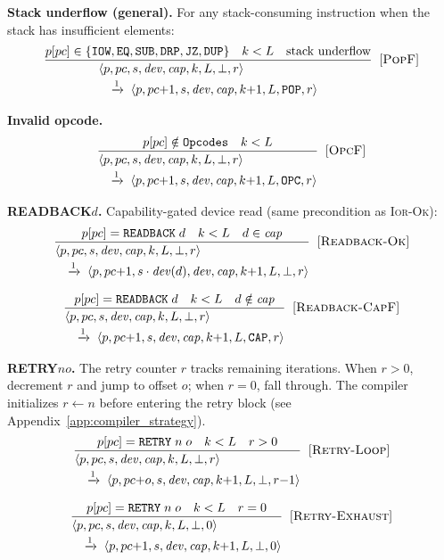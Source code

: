 \documentclass[a4paper,fleqn,longmktitle]{cas-dc}
\makeatletter
\newcommand{\irule}[4]{%
  \[
  \frac{\displaystyle #1}
       {\displaystyle
        \begin{array}{@{}l@{}}
          #2 \\[2pt]
          \quad\xrightarrow{1}\; #3
        \end{array}}
  \;\;[\textsc{#4}]
  \]%
}
\makeatother
\begin{document}
{\noindent\textbf{Stack underflow (general).} For any stack-consuming instruction when the stack has insufficient elements:
\irule{p[pc] \in \{\texttt{IOW}, \texttt{EQ}, \texttt{SUB}, \texttt{DRP}, \texttt{JZ}, \texttt{DUP}\} \quad k < L \quad \text{stack underflow}}
      {\langle p, pc, s, \mathit{dev}, \mathit{cap}, k, L, \bot, r \rangle}
      {\langle p, pc{+}1, s, \mathit{dev}, \mathit{cap}, k{+}1, L, \texttt{POP}, r \rangle}
      {PopF}

\noindent\textbf{Invalid opcode.}
\irule{p[pc] \notin \texttt{Opcodes} \quad k < L}
      {\langle p, pc, s, \mathit{dev}, \mathit{cap}, k, L, \bot, r \rangle}
      {\langle p, pc{+}1, s, \mathit{dev}, \mathit{cap}, k{+}1, L, \texttt{OPC}, r \rangle}
      {OpcF}

\noindent\textbf{READBACK\;$d$.} Capability-gated device read (same precondition as \textsc{Ior-Ok}):
\irule{p[pc] = \texttt{READBACK}\;d \quad k < L \quad d \in \mathit{cap}}
      {\langle p, pc, s, \mathit{dev}, \mathit{cap}, k, L, \bot, r \rangle}
      {\langle p, pc{+}1, s \cdot \mathit{dev}(d), \mathit{dev}, \mathit{cap}, k{+}1, L, \bot, r \rangle}
      {Readback-Ok}
\irule{p[pc] = \texttt{READBACK}\;d \quad k < L \quad d \notin \mathit{cap}}
      {\langle p, pc, s, \mathit{dev}, \mathit{cap}, k, L, \bot, r \rangle}
      {\langle p, pc{+}1, s, \mathit{dev}, \mathit{cap}, k{+}1, L, \texttt{CAP}, r \rangle}
      {Readback-CapF}

\noindent\textbf{RETRY\;$n$\;$o$.} The retry counter $r$ tracks remaining iterations. When $r > 0$, decrement $r$ and jump to offset $o$; when $r = 0$, fall through. The compiler initializes $r \leftarrow n$ before entering the retry block (see Appendix~\ref{app:compiler_strategy}).
\irule{p[pc] = \texttt{RETRY}\;n\;o \quad k < L \quad r > 0}
      {\langle p, pc, s, \mathit{dev}, \mathit{cap}, k, L, \bot, r \rangle}
      {\langle p, pc{+}o, s, \mathit{dev}, \mathit{cap}, k{+}1, L, \bot, r{-}1 \rangle}
      {Retry-Loop}
\irule{p[pc] = \texttt{RETRY}\;n\;o \quad k < L \quad r = 0}
      {\langle p, pc, s, \mathit{dev}, \mathit{cap}, k, L, \bot, 0 \rangle}
      {\langle p, pc{+}1, s, \mathit{dev}, \mathit{cap}, k{+}1, L, \bot, 0 \rangle}
      {Retry-Exhaust}

}
\end{document}
